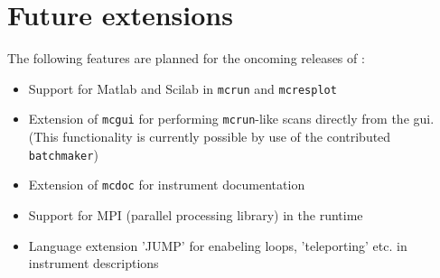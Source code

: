 \section{Future extensions}
\label{s:future}
The following features are planned for the oncoming releases of \MCS :
\begin{itemize}
\item Support for Matlab and Scilab in \verb+mcrun+ and
  \verb+mcresplot+
\item Extension of \verb+mcgui+ for performing \verb+mcrun+-like scans
  directly from the gui. (This functionality is currently possible by
  use of the contributed \verb+batchmaker+)
\item Extension of \verb+mcdoc+ for instrument documentation
\item Support for MPI (parallel processing library) in the runtime
\item Language extension 'JUMP' for enabeling loops, 'teleporting'
  etc. in instrument descriptions
\end{itemize}








